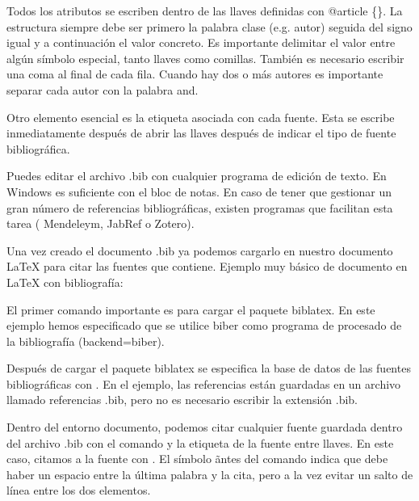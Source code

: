 \documentclass[11pt, a4paper]{article}
\begin{document}
Todos los atributos se escriben dentro de las llaves definidas con @article \{\}. La estructura siempre debe ser primero la palabra clase (e.g. autor) seguida del signo igual y a continuación el valor concreto. Es importante delimitar el valor entre algún símbolo especial, tanto llaves como comillas. También es necesario escribir una coma al final de cada fila. Cuando hay dos o más autores es importante separar cada autor con la palabra and. 

Otro elemento esencial es la etiqueta asociada con cada fuente. Esta se escribe inmediatamente después de abrir las llaves después de indicar el tipo de fuente bibliográfica. 

Puedes editar el archivo .bib con cualquier programa de edición de texto. En Windows es suficiente con el bloc de notas. En caso de tener que gestionar un gran número de referencias bibliográficas, existen programas que facilitan esta tarea ( Mendeleym, JabRef o Zotero).

Una vez creado el documento .bib ya podemos cargarlo en nuestro documento LaTeX para citar las fuentes que contiene. Ejemplo muy básico de documento en LaTeX con bibliografía:










El primer comando importante es para cargar el paquete biblatex. En este ejemplo hemos especificado que se utilice biber como programa de procesado de la bibliografía (backend=biber).

Después de cargar el paquete biblatex se especifica la base de datos de las fuentes bibliográficas con . En el ejemplo, las referencias están guardadas en un archivo llamado referencias .bib, pero no es necesario escribir la extensión .bib.

Dentro del entorno documento, podemos citar cualquier fuente guardada dentro del archivo .bib con el comando  y la etiqueta de la fuente entre llaves. En este caso, citamos a la fuente  con . El símbolo \~ antes del comando  indica que debe haber un espacio entre la última palabra y la cita, pero a la vez evitar un salto de línea entre los dos elementos.
\end{document}
